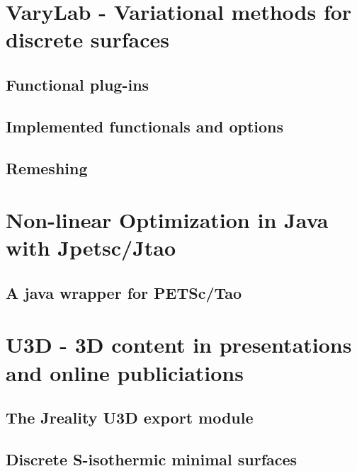\documentclass[Thesis.tex]{subfiles}
\begin{document}
\chapter{{\sc VaryLab} - Variational methods for discrete surfaces}
\label{sec:varylab}

\section{Functional plug-ins}
\section{Implemented functionals and options}
\section{Remeshing}

\chapter{Non-linear Optimization in {\sc Java} with {\sc Jpetsc/Jtao}}
\label{sec:jpetsctao}

\section{A java wrapper for {\sc PETSc/Tao}}

\chapter{{\sc U3D} - 3D content in presentations and online publiciations}
\label{sec:u3d}
\section{The {\sc Jreality} U3D export module}
\section{Discrete S-isothermic minimal surfaces}

\subfilebibliography
\end{document}
